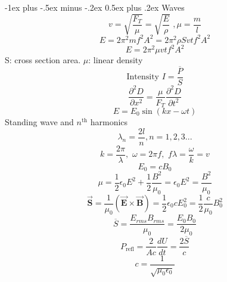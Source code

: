 \documentclass[12pt,landscape]{article}
\makeatletter
\renewcommand{\section}{\@startsection{section}{1}{0mm}%
                                {-1ex plus -.5ex minus -.2ex}%
                                {0.5ex plus .2ex}%
                                {\normalfont\large\bfseries}}
\makeatother
\begin{document}
\begin{multicols}{4}
    \section{Waves}
    \begin{equation*}
        v = \sqrt{\frac{F_T}{\mu}} = \sqrt{\frac{E}{\rho}}\,\,, \mu = \frac{m}{l}
    \end{equation*}
    \begin{equation*}
        E = 2\pi^2 m f^2 A^2 = 2\pi^2 \rho S v t f^2 A^2
    \end{equation*}
    \begin{equation*}
        E = 2 \pi^2 \mu v t f^2 A^2
    \end{equation*}
    S: cross section area. $\mu$: linear density
    \begin{equation*}
        \text{Intensity } I = \frac{\overbar{P}}{S}
    \end{equation*}
    \begin{equation*}
        \frac{\partial^2 D}{\partial x^2} = \frac{\mu}{F_T} \frac{\partial^2 D}{\partial t^2}
    \end{equation*}
    \begin{equation*}
        E = E_0 \sin (kx - \omega t)
    \end{equation*}
    Standing wave and $n^{\text{th}}$ harmonics
    \begin{equation*}
        \lambda_n = \frac{2l}{n}, n = 1, 2, 3...
    \end{equation*}
    \begin{equation*}
        k = \frac{2\pi}{\lambda}, \,\, \omega = 2\pi f,\,\, f \lambda = \frac{\omega}{k} = v
    \end{equation*}
    \begin{equation*}
        E_0 = c B_0
    \end{equation*}
    \begin{equation*}
        \mu = \frac{1}{2}\epsilon_0 E^2 + \frac{1}{2} \frac{B^2}{\mu_0} = \epsilon_0 E^2 = \frac{B^2}{\mu_0}
    \end{equation*}
    \begin{equation*}
        \vec{\mathbf{S}} = \frac{1}{\mu_0} (\vec{\mathbf{E}} \times \vec{\mathbf{B}}) = \frac{1}{2} \epsilon_0 c E_0^2 = \frac{1}{2} \frac{c}{\mu_0} B_0^2
    \end{equation*}
    \begin{equation*}
        \overbar{S} = \frac{E_{rms}B_{rms}}{\mu_0} = \frac{E_0 B_0}{2 \mu_0}
    \end{equation*}
    \begin{equation*}
        P_{\text{refl}} = \frac{2}{Ac} \frac{dU}{dt} = \frac{2 \overbar{S}}{c}
    \end{equation*}
    \begin{equation*}
        c = \frac{1}{\sqrt{\mu_0 \epsilon_0}}
    \end{equation*}


\end{multicols}
\end{document}
